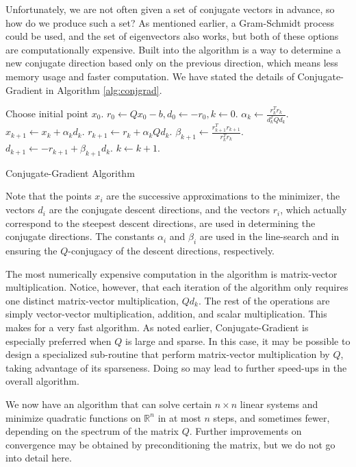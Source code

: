 Unfortunately, we are not often given a set of conjugate vectors in advance, so how do we produce such a set? As mentioned earlier, a 
Gram-Schmidt process could be used, and the set of eigenvectors also works, but both of these options are computationally expensive. 
Built into the algorithm is a way to determine a new conjugate direction based only on the previous direction, which means less memory usage and 
faster computation. We have stated the details of Conjugate-Gradient in Algorithm \ref{alg:conjgrad}.
\begin{algorithm}
\begin{algorithmic}[1]
    \State \textrm{Choose initial point } $x_0$.
    \State $r_0 \gets Qx_0 - b, d_0 \gets -r_0, k \gets 0$.
        \State $\alpha_k \gets \frac{r_k^Tr_k}{d_k^TQd_k}$.
        \State $x_{k+1} \gets x_k + \alpha_kd_k$.
        \State $r_{k+1} \gets r_k + \alpha_kQd_k$.
        \State $\beta_{k+1} \gets \frac{r_{k+1}^Tr_{k+1}}{r_k^Tr_k}$.
        \State $d_{k+1} \gets -r_{k+1} + \beta_{k+1}d_k$.
        \State $k \gets k+1$.
    \EndWhile
\EndProcedure
\end{algorithmic}
\caption{Conjugate-Gradient Algorithm}
\label{alg:conjgrad}
\end{algorithm}

Note that the points $x_i$ are the successive approximations to the minimizer, the vectors $d_i$ are the conjugate descent 
directions, and the vectors $r_i$, which actually correspond to the steepest descent directions, are used in determining the conjugate directions. 
The constants $\alpha_i$ and $\beta_i$ are used in the line-search and in ensuring the $Q$-conjugacy of the descent directions, respectively.

The most numerically expensive computation in the algorithm is matrix-vector multiplication.
Notice, however, that each iteration of the algorithm only requires one distinct matrix-vector multiplication, $Qd_k$. The rest of the
operations are simply vector-vector multiplication, addition, and scalar multiplication. This makes for a very fast algorithm.
As noted earlier, Conjugate-Gradient is especially preferred when $Q$ is large and sparse. In this case, it may be possible to 
design a specialized sub-routine that perform matrix-vector multiplication by $Q$, taking advantage of its sparseness. Doing so may 
lead to further speed-ups in the overall algorithm. 

We now have an algorithm that can solve certain $n \times n$ linear systems and minimize quadratic functions on $\mathbb{R}^n$ in at most $n$ steps, 
and sometimes fewer, depending on the spectrum of the matrix $Q$. Further improvements on convergence may be obtained by preconditioning the matrix, 
but we do not go into detail here.


